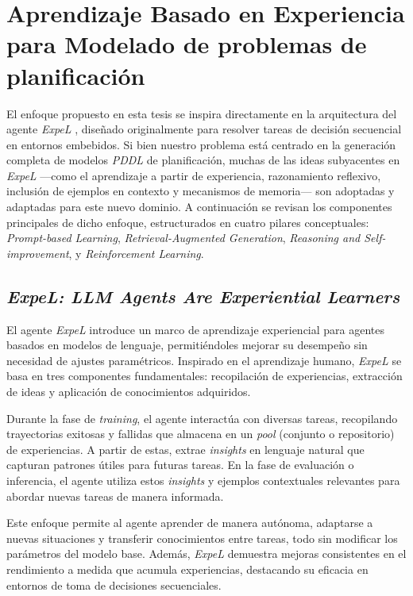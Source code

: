 \section{Aprendizaje Basado en Experiencia para Modelado de problemas de planificación}

El enfoque propuesto en esta tesis se inspira directamente en la arquitectura del agente \textit{ExpeL} \parencite{zhao2024expel}, diseñado originalmente para resolver tareas de decisión secuencial en entornos embebidos. Si bien nuestro problema está centrado en la generación completa de modelos \textit{PDDL} de planificación, muchas de las ideas subyacentes en \textit{ExpeL} —como el aprendizaje a partir de experiencia, razonamiento reflexivo, inclusión de ejemplos en contexto y mecanismos de memoria— son adoptadas y adaptadas para este nuevo dominio. A continuación se revisan los componentes principales de dicho enfoque, estructurados en cuatro pilares conceptuales: \textit{Prompt-based Learning}, \textit{Retrieval-Augmented Generation}, \textit{Reasoning and Self-improvement}, y \textit{Reinforcement Learning}.

\subsection{\textit{ExpeL: LLM Agents Are Experiential Learners}}

El agente \textit{ExpeL} \parencite{zhao2024expel} introduce un marco de aprendizaje experiencial para agentes basados en modelos de lenguaje, permitiéndoles mejorar su desempeño sin necesidad de ajustes paramétricos. Inspirado en el aprendizaje humano, \textit{ExpeL} se basa en tres componentes fundamentales: recopilación de experiencias, extracción de ideas y aplicación de conocimientos adquiridos.

Durante la fase de \textit{training}, el agente interactúa con diversas tareas, recopilando trayectorias exitosas y fallidas que almacena en un \textit{pool} (conjunto o repositorio) de experiencias. A partir de estas, extrae \textit{insights} en lenguaje natural que capturan patrones útiles para futuras tareas. En la fase de evaluación o inferencia, el agente utiliza estos \textit{insights} y ejemplos contextuales relevantes para abordar nuevas tareas de manera informada.

Este enfoque permite al agente aprender de manera autónoma, adaptarse a nuevas situaciones y transferir conocimientos entre tareas, todo sin modificar los parámetros del modelo base. Además, \textit{ExpeL} demuestra mejoras consistentes en el rendimiento a medida que acumula experiencias, destacando su eficacia en entornos de toma de decisiones secuenciales.

